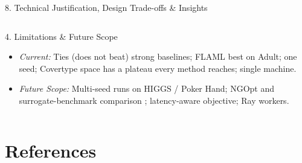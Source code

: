 \documentclass[aspectratio=169, 11pt]{beamer}
\begin{document}
\begin{frame}{8. Technical Justification, Design Trade-offs \& Insights}
\begin{columns}[T]
        \begin{block}{4. Limitations \& Future Scope}
            \scriptsize
            \begin{itemize}
                \setlength{\itemsep}{1pt}
                \item \textit{Current:} Ties (does not beat) strong baselines; FLAML best on Adult; one seed; Covertype space has a plateau every method reaches; single machine.
                \item \textit{Future Scope:} Multi-seed runs on HIGGS / Poker Hand; NGOpt and surrogate-benchmark comparison \cite{benjamins2025carps}; latency-aware objective; Ray workers.
            \end{itemize}
        \end{block}
    \end{columns}
\end{frame}



\section{References}
\end{document}
